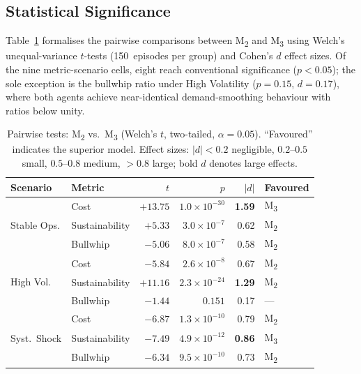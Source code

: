 \documentclass[preprint,12pt]{elsarticle}
\begin{document}
\subsection{Statistical Significance}
\label{sec:statistics}

Table~\ref{tab:significance} formalises the pairwise comparisons between M\textsubscript{2} and M\textsubscript{3} using Welch's unequal-variance $t$-tests (150~episodes per group) and Cohen's $d$ effect sizes.
Of the nine metric-scenario cells, eight reach conventional significance ($p < 0.05$); the sole exception is the bullwhip ratio under High Volatility ($p = 0.15$, $d = 0.17$), where both agents achieve near-identical demand-smoothing behaviour with ratios below unity.

\begin{table}[htbp]
\centering
\caption{Pairwise tests: M\textsubscript{2} vs.\ M\textsubscript{3} (Welch's $t$, two-tailed, $\alpha = 0.05$).
``Favoured'' indicates the superior model.
Effect sizes: $|d| < 0.2$ negligible, $0.2$--$0.5$ small, $0.5$--$0.8$ medium, $> 0.8$ large; bold $d$ denotes large effects.}
\label{tab:significance}
\small
\begin{tabular}{@{}l l r r r l@{}}
\toprule
Scenario & Metric & $t$ & $p$ & $|d|$ & Favoured \\
\midrule
\multirow{3}{*}{Stable Ops.}
  & Cost        & $+13.75$ & $1.0\!\times\!10^{-30}$ & \textbf{1.59} & M\textsubscript{3} \\
  & Sustainability & $+5.33$ & $3.0\!\times\!10^{-7}$ & 0.62 & M\textsubscript{2} \\
  & Bullwhip    & $-5.06$  & $8.0\!\times\!10^{-7}$  & 0.58 & M\textsubscript{2} \\
\midrule
\multirow{3}{*}{High Vol.}
  & Cost        & $-5.84$  & $2.6\!\times\!10^{-8}$  & 0.67 & M\textsubscript{2} \\
  & Sustainability & $+11.16$ & $2.3\!\times\!10^{-24}$ & \textbf{1.29} & M\textsubscript{2} \\
  & Bullwhip    & $-1.44$  & $0.151$                 & 0.17 & --- \\
\midrule
\multirow{3}{*}{Syst.\ Shock}
  & Cost        & $-6.87$  & $1.3\!\times\!10^{-10}$ & 0.79 & M\textsubscript{2} \\
  & Sustainability & $-7.49$ & $4.9\!\times\!10^{-12}$ & \textbf{0.86} & M\textsubscript{3} \\
  & Bullwhip    & $-6.34$  & $9.5\!\times\!10^{-10}$ & 0.73 & M\textsubscript{2} \\
\bottomrule
\end{tabular}
\end{table}
\end{document}
